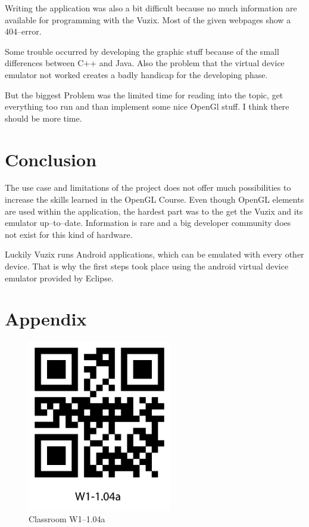 \documentclass[11pt]{scrartcl}
\begin{document}
\begin{multicols}{2}
			Writing the application was also a bit difficult because no much information are available for programming with the Vuzix. Most of the given webpages show a 404--error.
			 
			 Some trouble occurred by developing the graphic stuff because of the small differences between C++ and Java. Also the problem that the virtual device emulator not worked creates a badly handicap for the developing phase.
			 
			 But the biggest Problem was the limited time for reading into the topic, get everything too run and than implement some nice OpenGl stuff. I think there should be more time.
			
	\section{Conclusion}
		The use case and limitations of the project does not offer much possibilities to increase the skills learned in the OpenGL Course. Even though OpenGL elements are used within the application, the hardest part was to the get the Vuzix and its emulator up--to--date. Information is rare and a big developer community does not exist for this kind of hardware.
		
		Luckily Vuzix runs Android applications, which can be emulated with every other device. That is why the first steps took place using the android virtual device emulator provided by Eclipse.
\end{multicols}




\section*{Appendix}
	\begin{figure}[htpb]
		\centering
		\includegraphics[height=7.5cm]{figure/qrcode_W1-104a}
		\caption{Classroom W1--1.04a\label{qrCodeW1-1.04a}}
	\end{figure}
	
\end{document}
